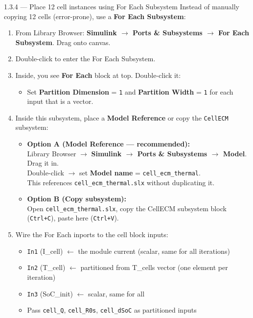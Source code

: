 \documentclass[11pt,a4paper]{article}
\begin{document}
\begin{guistep}{1.3.4 — Place 12 cell instances using For Each Subsystem}
Instead of manually copying 12 cells (error-prone), use a \textbf{For Each Subsystem}:
\begin{enumerate}
    \item From Library Browser: \textbf{Simulink $\to$ Ports \& Subsystems $\to$ For Each Subsystem}. Drag onto canvas.
    \item Double-click to enter the For Each Subsystem.
    \item Inside, you see \textbf{For Each} block at top. Double-click it:
    \begin{itemize}
        \item Set \textbf{Partition Dimension} = \texttt{1} and \textbf{Partition Width} = \texttt{1} for each input that is a vector.
    \end{itemize}
    \item Inside this subsystem, place a \textbf{Model Reference} or copy the \texttt{CellECM} subsystem:
    \begin{itemize}
        \item \textbf{Option A (Model Reference — recommended):}\\
              Library Browser $\to$ \textbf{Simulink $\to$ Ports \& Subsystems $\to$ Model}. Drag it in.\\
              Double-click $\to$ set \textbf{Model name} = \texttt{cell\_ecm\_thermal}.\\
              This references \texttt{cell\_ecm\_thermal.slx} without duplicating it.
        \item \textbf{Option B (Copy subsystem):}\\
              Open \texttt{cell\_ecm\_thermal.slx}, copy the CellECM subsystem block (\texttt{Ctrl+C}), paste here (\texttt{Ctrl+V}).
    \end{itemize}
    \item Wire the For Each inports to the cell block inputs:
    \begin{itemize}
        \item \texttt{In1} (I\_cell) $\leftarrow$ the module current (scalar, same for all iterations)
        \item \texttt{In2} (T\_cell) $\leftarrow$ partitioned from T\_cells vector (one element per iteration)
        \item \texttt{In3} (SoC\_init) $\leftarrow$ scalar, same for all
        \item Pass \texttt{cell\_Q}, \texttt{cell\_R0s}, \texttt{cell\_dSoC} as partitioned inputs

\end{itemize}
\end{enumerate}
\end{guistep}
\end{document}

